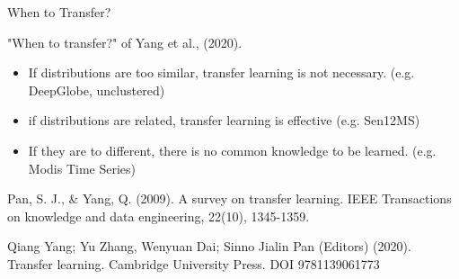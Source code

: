 \documentclass[11pt]{beamer}
\newcommand{\citeapa}[1]{ {\tiny#1\par} }
\begin{document}
	\begin{frame}{When to Transfer?}
		
	
		\vspace{1em}
		"When to transfer?" of Yang et al., (2020). 
		\begin{itemize}
			\item If distributions are too similar, transfer learning is not necessary. (e.g. DeepGlobe, unclustered)
			\item if distributions are related, transfer learning is effective (e.g. Sen12MS)
			\item If they are to different, there is no common knowledge to be learned. (e.g. Modis Time Series)
		\end{itemize} 
	
		\vfill
		
		\citeapa{Pan, S. J., \& Yang, Q. (2009). A survey on transfer learning. IEEE Transactions on knowledge and data engineering, 22(10), 1345-1359.}
		\citeapa{Qiang Yang; Yu Zhang, Wenyuan Dai; Sinno Jialin Pan (Editors) (2020). Transfer learning. Cambridge University Press. DOI 9781139061773}
	\end{frame}
\end{document}
